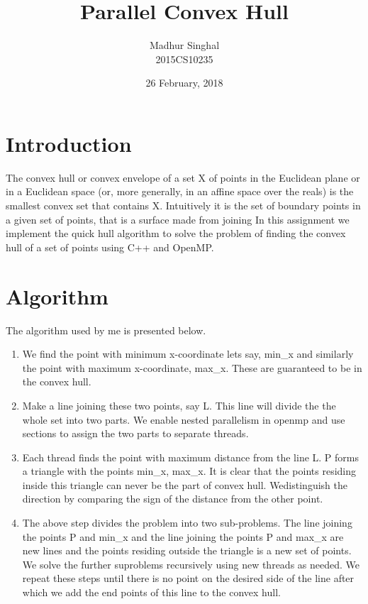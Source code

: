 \documentclass[12pt,a4paper]{article}
\author{Madhur Singhal\\2015CS10235}
\title{Parallel Convex Hull}
\date{26 February, 2018}
\begin{document}
\maketitle
\section{Introduction}
The convex hull or convex envelope of a set X of points in the Euclidean plane or in a Euclidean space (or, more generally, in an affine space over the reals) is the smallest convex set that contains X. Intuitively it is the set of boundary points in a given set of points, that is a surface made from joining In this assignment we implement the quick hull algorithm to solve the problem of finding the convex hull of a set of points using C++ and OpenMP.
\section{Algorithm}
The algorithm used by me is presented below.
\begin{enumerate}

   \item We find the point with minimum x-coordinate lets say, min\_x and similarly the point with maximum x-coordinate, max\_x. These are guaranteed to be in the convex hull.
 \item   Make a line joining these two points, say L. This line will divide the the whole set into two parts. We enable nested parallelism in openmp and use sections to assign the two parts to separate threads.
    \item Each thread finds the point with maximum distance from the line L. P forms a triangle with the points min\_x, max\_x. It is clear that the points residing inside this triangle can never be the part of convex hull. Wedistinguish the direction by comparing the sign of the distance from the other point.
    \item The above step divides the problem into two sub-problems. The line joining the points P and min\_x and the line joining the points P and max\_x are new lines and the points residing outside the triangle is a new set of points.  We solve the further suproblems recursively using new threads as needed. We repeat these steps until there is no point on the desired side of the line after which we add the end points of this line to the convex hull.

\end{enumerate}
\end{document}

